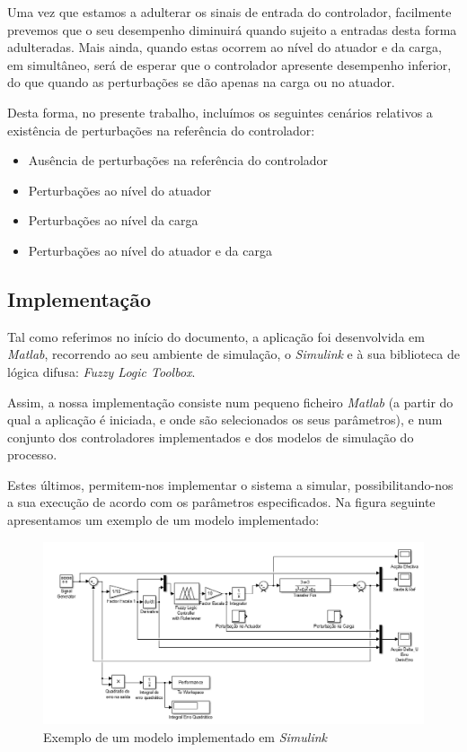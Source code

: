 \documentclass{article}
\begin{document}
Uma vez que estamos a adulterar os sinais de entrada do controlador, facilmente prevemos que o seu desempenho diminuirá quando sujeito a entradas desta forma adulteradas. Mais ainda, quando estas ocorrem ao nível do atuador e da carga, em simultâneo, será de esperar que o controlador apresente desempenho inferior, do que quando as perturbações se dão apenas na carga ou no atuador.

Desta forma, no presente trabalho, incluímos os seguintes cenários relativos a existência de perturbações na referência do controlador:

\begin{itemize}
\item Ausência de perturbações na referência do controlador
\item Perturbações ao nível do atuador
\item Perturbações ao nível da carga
\item Perturbações ao nível do atuador e da carga
\end{itemize}


\subsection{Implementação}

Tal como referimos no início do documento, a aplicação foi desenvolvida em \emph{Matlab}, recorrendo ao seu ambiente de simulação, o \emph{Simulink} e à sua biblioteca de lógica difusa: \emph{Fuzzy Logic Toolbox}.

Assim, a nossa implementação consiste num pequeno ficheiro \emph{Matlab} (a partir do qual a aplicação é iniciada, e onde são selecionados os seus parâmetros), e num conjunto dos controladores implementados e dos modelos de simulação do processo.

Estes últimos, permitem-nos implementar o sistema a simular, possibilitando-nos a sua execução de acordo com os parâmetros especificados. Na figura seguinte apresentamos um exemplo de um modelo implementado:

\begin{figure}[H]
  \centering
      \includegraphics[scale=0.5]{Images/Controller_example.png}
  \caption{Exemplo de um modelo implementado em \emph{Simulink}}
\end{figure}
\end{document}
